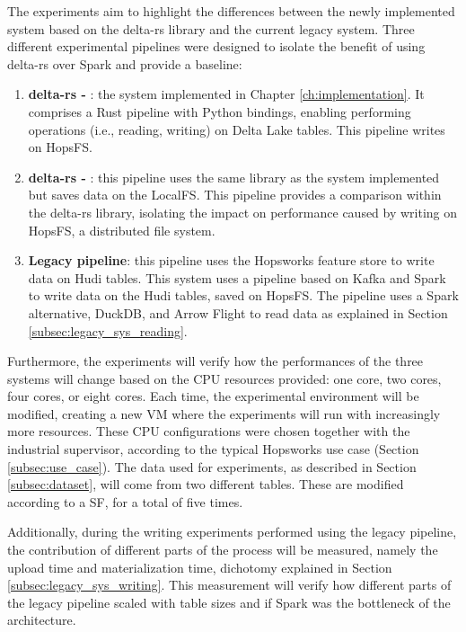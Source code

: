 The experiments aim to highlight the differences between the newly implemented system based on the delta-rs library and the current legacy system. Three different experimental pipelines were designed to isolate the benefit of using delta-rs over Spark and provide a baseline:
\begin{enumerate}
    \item \textbf{delta-rs - }: the system implemented in Chapter \ref{ch:implementation}. It comprises a Rust pipeline with Python bindings, enabling performing operations (i.e., reading, writing) on Delta Lake tables. This pipeline writes on \gls{HopsFS}.
    \item \textbf{delta-rs - }: this pipeline uses the same library as the system implemented but saves data on the \gls{LocalFS}. This pipeline provides a comparison within the delta-rs library, isolating the impact on performance caused by writing on \gls{HopsFS}, a distributed file system.
    \item \textbf{Legacy pipeline}: this pipeline uses the Hopsworks feature store to write data on Hudi tables. This system uses a pipeline based on Kafka and Spark to write data on the Hudi tables, saved on \gls{HopsFS}. The pipeline uses a Spark alternative, DuckDB, and Arrow Flight to read data as explained in Section \ref{subsec:legacy_sys_reading}. 
\end{enumerate}

Furthermore, the experiments will verify how the performances of the three systems will change based on the \gls{CPU} resources provided: one core, two cores, four cores, or eight cores. Each time, the experimental environment will be modified, creating a new \gls{VM} where the experiments will run with increasingly more resources. These \gls{CPU} configurations were chosen together with the industrial supervisor, according to the typical Hopsworks use case (Section \ref{subsec:use_case}). The data used for experiments, as described in Section \ref{subsec:dataset}, will come from two different tables. These are modified according to a \gls{SF}, for a total of five times. 

Additionally, during the writing experiments performed using the legacy pipeline, the contribution of different parts of the process will be measured, namely the upload time and materialization time, dichotomy explained in Section \ref{subsec:legacy_sys_writing}. This measurement will verify how different parts of the legacy pipeline scaled with table sizes and if Spark was the bottleneck of the architecture.

